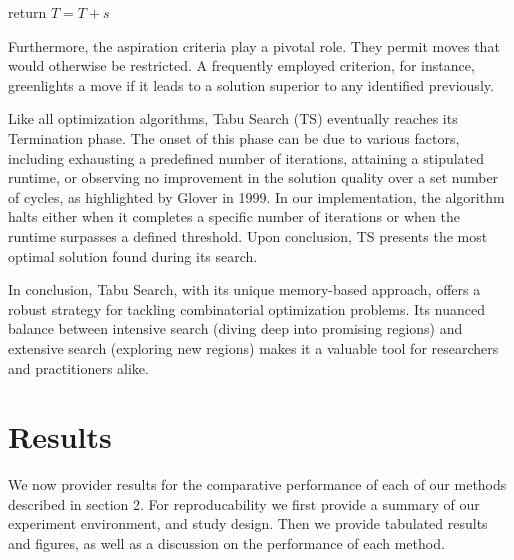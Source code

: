 \documentclass[a4paper,10pt]{article}
\begin{document}
\begin{algorithm}[H]
\begin{algorithmic}
        \State return \(T = T + s\)
    \EndProcedure
\end{algorithmic}
\end{algorithm}



Furthermore, the aspiration criteria play a pivotal role. They permit moves that would otherwise be restricted. A frequently employed criterion, for instance, greenlights a move if it leads to a solution superior to any identified previously.

Like all optimization algorithms, Tabu Search (TS) eventually reaches its Termination phase. The onset of this phase can be due to various factors, including exhausting a predefined number of iterations, attaining a stipulated runtime, or observing no improvement in the solution quality over a set number of cycles, as highlighted by Glover in 1999\cite{GLOVER1999}. In our implementation, the algorithm halts either when it completes a specific number of iterations or when the runtime surpasses a defined threshold. Upon conclusion, TS presents the most optimal solution found during its search.

In conclusion, Tabu Search, with its unique memory-based approach, offers a robust strategy for tackling combinatorial optimization problems. Its nuanced balance between intensive search (diving deep into promising regions) and extensive search (exploring new regions) makes it a valuable tool for researchers and practitioners alike\cite{GLOVER1999}.



\newpage

\section{Results}
We now provider results for the comparative performance of each of our methods described in section 2. For reproducability we first provide a summary of our experiment environment, and study design. Then we provide tabulated results and figures, as well as a discussion on the performance of each method.
\end{document}
